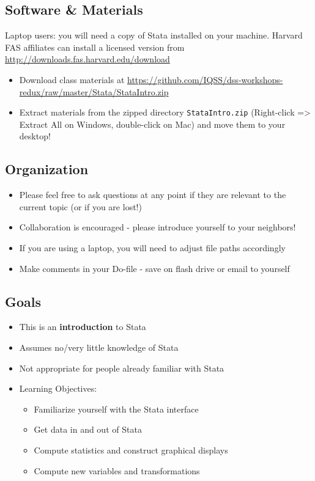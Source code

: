 \documentclass[]{book}
\providecommand{\tightlist}{%
  \setlength{\itemsep}{0pt}\setlength{\parskip}{0pt}}
\begin{document}
\subsection{Software \& Materials}\label{software-materials-6}

Laptop users: you will need a copy of Stata installed on your machine.
Harvard FAS affiliates can install a licensed version from
\url{http://downloads.fas.harvard.edu/download}

\begin{itemize}
\tightlist
\item
  Download class materials at
  \url{https://github.com/IQSS/dss-workshops-redux/raw/master/Stata/StataIntro.zip}
\item
  Extract materials from the zipped directory \texttt{StataIntro.zip}
  (Right-click =\textgreater{} Extract All on Windows, double-click on
  Mac) and move them to your desktop!
\end{itemize}

\subsection{Organization}\label{organization}

\begin{itemize}
\tightlist
\item
  Please feel free to ask questions at any point if they are relevant to
  the current topic (or if you are lost!)
\item
  Collaboration is encouraged - please introduce yourself to your
  neighbors!
\item
  If you are using a laptop, you will need to adjust file paths
  accordingly
\item
  Make comments in your Do-file - save on flash drive or email to
  yourself
\end{itemize}

\subsection{Goals}\label{goals-6}

\begin{itemize}
\tightlist
\item
  This is an \textbf{introduction} to Stata
\item
  Assumes no/very little knowledge of Stata
\item
  Not appropriate for people already familiar with Stata
\item
  Learning Objectives:

  \begin{itemize}
  \tightlist
  \item
    Familiarize yourself with the Stata interface
  \item
    Get data in and out of Stata
  \item
    Compute statistics and construct graphical displays
  \item
    Compute new variables and transformations
  \end{itemize}
\end{itemize}
\end{document}
